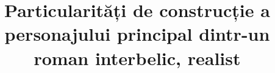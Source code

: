 

\title{Particularități de construcție a personajului principal dintr-un roman interbelic, realist}


 \maketitle %
 

